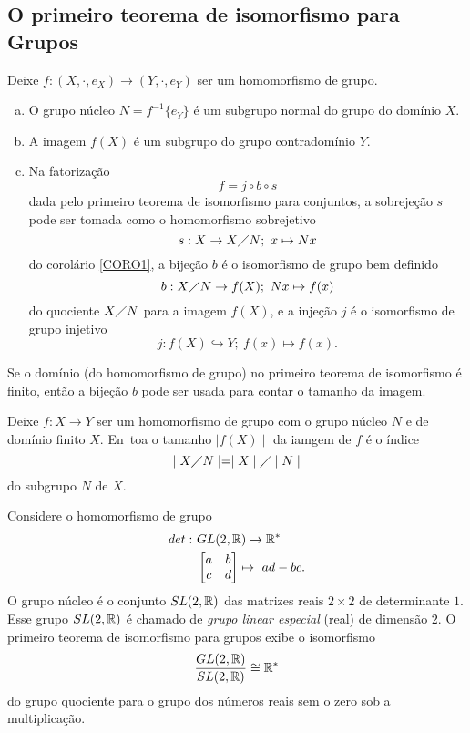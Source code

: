 \subsection{O primeiro teorema de isomorfismo para Grupos}
\begin{theorem}
  Deixe $f: (X, \cdot, e_{X}) \to (Y, \cdot, e_{Y})$ ser um homomorfismo de grupo.
\begin{enumerate}[(a)]
  \item O grupo núcleo $N = f^{-1}\{e_{Y}\}$ é um subgrupo normal do grupo do domínio $X$.
  \item A imagem $f(X)$ é um subgrupo do grupo contradomínio $Y$.
  \item Na fatorização $$f = j \circ b \circ s$$ dada pelo primeiro teorema de isomorfismo para conjuntos, a sobrejeção $s$ pode ser tomada como o homomorfismo sobrejetivo $$s: X\to X\diagup N;\ x\mapsto Nx$$ do corolário \ref{CORO1}, a bijeção $b$ é o isomorfismo de grupo bem definido $$b: X\diagup N \to f(X);\ Nx \mapsto f(x)$$ do quociente $X\diagup N$ para a imagem $f(X)$, e a injeção $j$ é o isomorfismo de grupo injetivo $$j: f(X) \hookrightarrow Y;\ f(x) \mapsto f(x).$$
\end{enumerate}
  Se o domínio (do homomorfismo de grupo) no primeiro teorema de isomorfismo é finito, então a bijeção $b$ pode ser usada para contar o tamanho da imagem.
\end{theorem}
\begin{corollary}\label{GHOMO}
  Deixe $f: X\to Y$ ser um homomorfismo de grupo com o grupo núcleo $N$ e de domínio finito $X$. En~toa o tamanho $\mid f(X) \mid$ da iamgem de $f$ é o índice $$\mid X\diagup N\mid = \mid X \mid \diagup \mid N \mid$$ do subgrupo $N$ de $X$.
\end{corollary}

\begin{exmp}
  Considere o homomorfismo de grupo  
  \begin{alignat}{2}
    det:\ &GL(2,\mathbb{R}) \to \mathbb{R}^{*}\nonumber\\
    &\begin{bmatrix}
      a & b\\
      c & d
    \end{bmatrix} \mapsto\ ad - bc.
    \nonumber
  \end{alignat}
  O grupo núcleo é o conjunto $SL(2,\mathbb{R})$ das matrizes reais $2 \times 2$ de determinante $1$. Esse grupo $SL(2,\mathbb{R})$ é chamado de \emph{grupo linear especial} (real) de dimensão $2$. O primeiro teorema de isomorfismo para grupos exibe o isomorfismo
  $$\dfrac{GL(2,\mathbb{R})}{SL(2,\mathbb{R})} \cong \mathbb{R}^{*}$$ do grupo quociente para o grupo dos números reais sem o zero sob a multiplicação.
\end{exmp}

